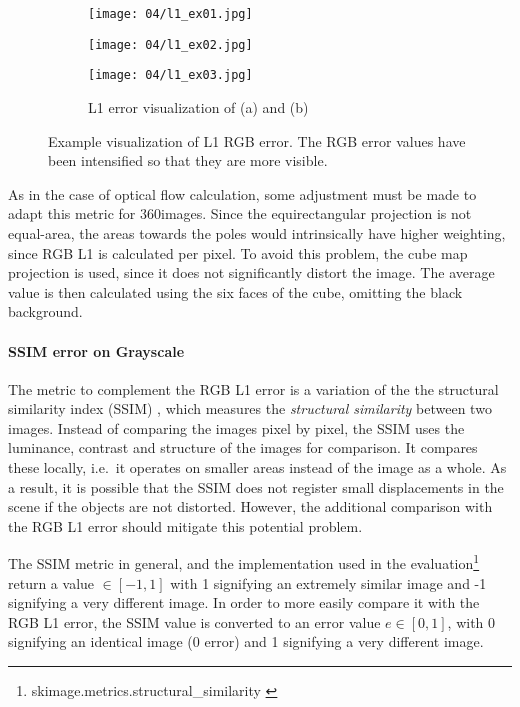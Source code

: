 \begin{figure}
\centering
    \hfill
    \begin{subfigure}[t]{0.3\textwidth}
            \centering
            \texttt{[image: 04/l1\_ex01.jpg]}
            \caption{}
    \end{subfigure}%
    \hfill
    \begin{subfigure}[t]{0.3\textwidth}
            \centering
            \texttt{[image: 04/l1\_ex02.jpg]}
            \caption{}
    \end{subfigure}
    \hfill
    \begin{subfigure}[t]{0.3\textwidth}
            \centering
            \texttt{[image: 04/l1\_ex03.jpg]}
            \caption{L1 error visualization of (a) and (b)}
    \end{subfigure}%
    \hfill
    \hfill
  \caption[Example visualization of L1 RGB error]{Example visualization of L1 RGB error. The RGB error values have been intensified so that they are more visible.} \label{fig:l1_example}
\end{figure}

As in the case of optical flow calculation, some adjustment must be made to adapt this metric for 360\degree images. Since the equirectangular projection is not equal-area, the areas towards the poles would intrinsically have higher weighting, since RGB L1 is calculated per pixel. To avoid this problem, the cube map projection is used, since it does not significantly distort the image. The average value is then calculated using the six faces of the cube, omitting the black background.

\paragraph{SSIM error on Grayscale}
The metric to complement the RGB L1 error is a variation of the the structural similarity index (SSIM) \cite{ssim}, which measures the \emph{structural similarity} between two images. Instead of comparing the images pixel by pixel, the SSIM uses the luminance, contrast and structure of the images for comparison. It compares these locally, i.e.\ it operates on smaller areas instead of the image as a whole. As a result, it is possible that the SSIM does not register small displacements in the scene if the objects are not distorted. However, the additional comparison with the RGB L1 error should mitigate this potential problem.

The SSIM metric in general, and the implementation used in the evaluation\footnote{skimage.metrics.structural\_similarity \cite{skimage}} return a value $\in [-1, 1]$ with 1 signifying an extremely similar image and -1 signifying a very different image. In order to more easily compare it with the RGB L1 error, the SSIM value is converted to an error value $ e \in [0,1]$, with 0 signifying an identical image (0 error) and 1 signifying a very different image.

